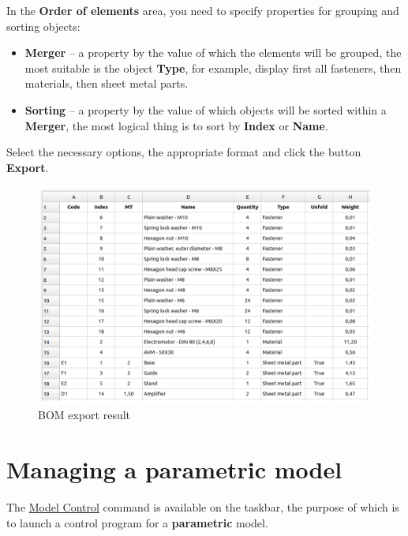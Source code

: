 \documentclass[a4paper,12pt]{article}
\begin{document}
In the \textbf{Order of elements} area, you need to specify properties for grouping and sorting objects:
\begin{itemize}
	\item \textbf{Merger} -- a property by the value of which the elements will be grouped, the most suitable is the object \textbf{Type}, for example, display first all fasteners, then materials, then sheet metal parts.
	\item \textbf{Sorting} -- a property by the value of which objects will be sorted within a \textbf{Merger}, the most logical thing is to sort by \textbf{Index} or \textbf{Name}.
\end{itemize}

\pagebreak

Select the necessary options, the appropriate format and click the button \textbf{Export}.

\begin{figure}[htp]
	\centering
	\includegraphics[width=1\textwidth]{img/specification_result.png}
	\caption{BOM export result}
	\label{sec:specification_result}
\end{figure}

\pagebreak




\section{Managing a parametric model}

The \hyperref[sec:3]{Model Control} command is available on the taskbar, the purpose of which is to launch a control program for a \textbf{parametric} model.\\
\end{document}
